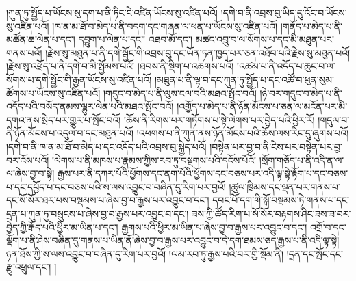 །ཀུན་ཏུ་སྤྱོད་པ་ཡོངས་སུ་དག་པ་ནི་ཏིང་ངེ་འཛིན་ཡོངས་སུ་འཛིན་པའོ། །དགེ་བ་ནི་འབྲས་བུ་ཡིད་དུ་འོང་བ་ཡོངས་སུ་འཛིན་པའོ། །ཁ་ན་མ་ཐོ་བ་མེད་པ་ནི་བདག་དང་གཞན་ལ་ཕན་པ་ཡོངས་སུ་འཛིན་པའོ། །གནོད་པ་མེད་པ་ནི་མཚོན་ཆ་ལེན་པ་དང་། དབྱུག་པ་ལེན་པ་དང་། འཐབ་མོ་དང་། མཚང་འབྲུ་བ་ལ་སོགས་པ་དང་མི་མཐུན་པར་གནས་པའོ། །རྗེས་སུ་མཐུན་པ་ནི་དགེ་སྦྱོང་གི་འབྲས་བུ་དང་ཡོན་ཏན་ཁྱད་པར་ཅན་འཐོབ་པའི་རྗེས་སུ་མཐུན་པའོ། །རྗེས་སུ་འཕྲོད་པ་ནི་དགེ་བ་མི་སྤྱོམས་པའོ། །ཐབས་ནི་སྡིག་པ་འཆགས་པའོ། །འཚམ་པ་ནི་འདོད་པ་ཆུང་བ་ལ་སོགས་པ་དགེ་སྦྱོང་གི་རྒྱན་ཡོངས་སུ་འཛིན་པའོ། །མཐུན་པ་ནི་ལྟ་བ་དང་ཀུན་ཏུ་སྤྱོད་པ་དང་འཚོ་བ་ཕུན་སུམ་ཚོགས་པ་ཡོངས་སུ་འཛིན་པའོ། །གདུང་བ་མེད་པ་ནི་ལུས་ངལ་བའི་མཐའ་སྤོང་བའོ། །ཉེ་བར་གདུང་བ་མེད་པ་ནི་འདོད་པའི་བསོད་ནམས་ལྷུར་ལེན་པའི་མཐའ་སྤོང་བའོ། །འགྱོད་པ་མེད་པ་ནི་ཉོན་མོངས་པ་ཅན་ལ་མངོན་པར་མི་དགའ་ནས་སྲེད་པར་གྱུར་པ་སྤོང་བའོ། །ཆོས་ནི་རིགས་པར་གཏོགས་པ་སྟེ་ལེགས་པར་བྱེད་པའི་ཕྱིར་རོ། །གདུལ་བ་ནི་ཉོན་མོངས་པ་འདུལ་བ་དང་མཐུན་པའོ། །འཕགས་པ་ནི་ཀུན་ནས་ཉོན་མོངས་པའི་ཆོས་ལས་རིང་དུ་ཞུགས་པའོ། །དགེ་བ་ནི་ཁ་ན་མ་ཐོ་བ་མེད་པ་དང་འདོད་པའི་འབྲས་བུ་སྐྱེད་པའོ། །བསྟེན་པར་བྱ་བ་ནི་ངེས་པར་བསྟེན་པར་བྱ་བར་འོས་པའོ། །ལེགས་པ་ནི་མཁས་པ་རྣམས་ཀྱིས་རབ་ཏུ་བསྔགས་པའི་དངོས་པོའོ། །སྲོག་གཅོད་པ་ནི་འདི་ན་ལ་ལ་ཞེས་བྱ་བ་སྟེ། རྒྱས་པར་ནི་དཀར་པོའི་ཕྱོགས་དང་ནག་པོའི་ཕྱོགས་དང་བཅས་པར་འདི་ལྟ་སྟེ་རྟོག་པ་དང་བཅས་པ་དང་དཔྱོད་པ་དང་བཅས་པའི་ས་ལས་འབྱུང་བ་བཞིན་དུ་རིག་པར་བྱའོ། །ཚུལ་ཁྲིམས་དང་ལྡན་པར་གནས་པ་དང་སོ་སོར་ཐར་པས་བསྡམས་པ་ཞེས་བྱ་བ་རྒྱས་པར་འབྱུང་བ་དང་། དབང་པོ་དག་གི་སྒོ་བསྡམས་ཏེ་གནས་པ་དང་དྲན་པ་ཀུན་ཏུ་བསྲུངས་པ་ཞེས་བྱ་བ་རྒྱས་པར་འབྱུང་བ་དང་། ཟས་ཀྱི་ཚོད་རིག་པ་སོ་སོར་བརྟགས་ཤིང་ཟས་ཟ་བར་བྱེད་ཀྱི་རྒོད་པའི་ཕྱིར་མ་ཡིན་པ་དང་། རྒྱགས་པའི་ཕྱིར་མ་ཡིན་པ་ཞེས་བྱ་བ་རྒྱས་པར་འབྱུང་བ་དང་། འགྲོ་བ་དང་ལྡོག་པ་ནི་ཤེས་བཞིན་དུ་གནས་པ་ཡིན་ནོ་ཞེས་བྱ་བ་རྒྱས་པར་འབྱུང་བ་དེ་དག་ཐམས་ཅད་རྒྱས་པ་ནི་འདི་ལྟ་སྟེ། ཉན་ཐོས་ཀྱི་ས་ལས་འབྱུང་བ་བཞིན་དུ་རིག་པར་བྱའོ། །ལམ་རབ་ཏུ་རྒྱས་པའི་བར་གྱི་སྡོམ་ནི། །དྲན་དང་སྤོང་དང་རྫུ་འཕྲུལ་དང་། །
